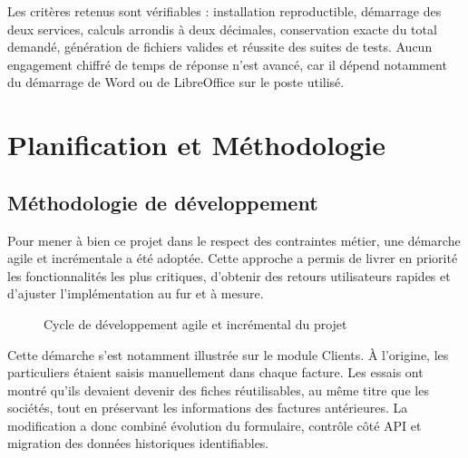 \documentclass[12pt,a4paper,oneside]{report}
\begin{document}
Les critères retenus sont vérifiables : installation reproductible, démarrage des deux services, calculs arrondis à deux décimales, conservation exacte du total demandé, génération de fichiers valides et réussite des suites de tests. Aucun engagement chiffré de temps de réponse n'est avancé, car il dépend notamment du démarrage de Word ou de LibreOffice sur le poste utilisé.

\chapter{Planification et Méthodologie}
\section{Méthodologie de développement}
Pour mener à bien ce projet dans le respect des contraintes métier, une démarche agile et incrémentale a été adoptée. Cette approche a permis de livrer en priorité les fonctionnalités les plus critiques, d'obtenir des retours utilisateurs rapides et d'ajuster l'implémentation au fur et à mesure. 

\begin{figure}[H]\centering
{}
\caption{Cycle de développement agile et incrémental du projet}
\end{figure}

Cette démarche s'est notamment illustrée sur le module Clients. À l'origine, les particuliers étaient saisis manuellement dans chaque facture. Les essais ont montré qu'ils devaient devenir des fiches réutilisables, au même titre que les sociétés, tout en préservant les informations des factures antérieures. La modification a donc combiné évolution du formulaire, contrôle côté API et migration des données historiques identifiables.
\end{document}
